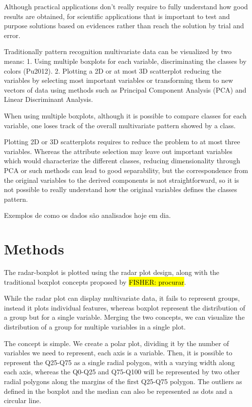 \documentclass[12pt]{article}
\begin{document}
Although practical applications don't really require to fully understand how good results are obtained, for scientific applications that is important to test and purpose solutions based on evidences rather than reach the solution by trial and error. 

Traditionally pattern recognition multivariate data can be visualized by two means: 1. Using multiple boxplots for each variable, discriminating the classes by colors (Pu2012). 2. Plotting a 2D or at most 3D scatterplot reducing the variables by selecting most important variables or transforming them to new vectors of data using methods such as Principal Component Analysis (PCA) and Linear Discriminant Analysis. 

When using multiple boxplots, although it is possible to compare classes for each variable, one loses track of the overall multivariate pattern showed by a class. 

Plotting 2D or 3D scatterplots requires to reduce the problem to at most three variables. Whereas the attribute selection may leave out important variables which would characterize the different classes, reducing dimensionality through PCA or such methods can lead to good separability, but the correspondence from the original variables to the derived components is not straightforward, so it is not possible to really understand how the original variables defines the classes pattern. 

Exemplos de como os dados são analisados hoje em dia.


\section{Methods}
\label{sec:meth}
The radar-boxplot is plotted using the radar plot design, along with the traditional boxplot concepts proposed by \hl{FISHER: procurar}. 

While the radar plot can display multivariate data, it fails to represent groups, instead it plots individual features, whereas boxplot represent the distribution of a group but for a single variable. Merging the two concepts, we can visualize the distribution of a group for multiple variables in a single plot. 

The concept is simple. We create a polar plot, dividing it by the number of variables we need to represent, each axis is a variable. Then, it is possible to represent the Q25-Q75 as a single radial polygon, with a varying width along each axis, whereas the Q0-Q25 and Q75-Q100 will be represented by two other radial polygons along the margins of the first Q25-Q75 polygon. The outliers as defined in the boxplot and the median can also be represented as dots and a circular line.
\end{document}
